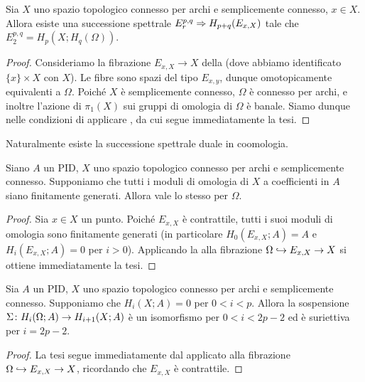 \begin{proposition}
Sia $X$ uno spazio topologico connesso per archi e semplicemente connesso, $x\in X$. Allora esiste una successione spettrale $E^{p,q}_r\Rightarrow H_{p+q}(E_{x,X})$ tale che $E^{p,q}_2=H_p(X;H_q(\Omega))$.
\end{proposition}
\begin{proof}
Consideriamo la fibrazione $E_{x,X}\to X$ della  (dove abbiamo identificato $\{x\}\times X$ con $X$). Le fibre sono spazi del tipo $E_{x,y}$, dunque omotopicamente equivalenti a $\Omega$. Poiché $X$ è semplicemente connesso, $\Omega$ è connesso per archi, e inoltre l'azione di $\pi_1(X)$ sui gruppi di omologia di $\Omega$ è banale. Siamo dunque nelle condizioni di applicare \missing{}, da cui segue immediatamente la tesi.
\end{proof}
Naturalmente esiste la successione spettrale duale in coomologia.

\begin{proposition}
Siano $A$ un PID, $X$ uno spazio topologico connesso per archi e semplicemente connesso. Supponiamo che tutti i moduli di omologia di $X$ a coefficienti in $A$ siano finitamente generati. Allora vale lo stesso per $\Omega$.
\end{proposition}
\begin{proof}
Sia $x\in X$ un punto. Poiché $E_{x,X}$ è contrattile, tutti i suoi moduli di omologia sono finitamente generati (in particolare $H_0(E_{x,X};A)=A$ e $H_i(E_{x,X};A)=0$ per $i>0$). Applicando la  alla fibrazione $\Omega\hookrightarrow E_{x,X}\to X$ si ottiene immediatamente la tesi.
\end{proof}

\begin{proposition}
Sia $A$ un PID, $X$ uno spazio topologico connesso per archi e semplicemente connesso. Supponiamo che $H_i(X;A)=0$ per $0<i<p$. Allora la sospensione $\Sigma\colon H_i(\Omega;A)\to H_{i+1}(X;A)$ è un isomorfismo per $0<i<2p-2$ ed è suriettiva per $i=2p-2$.
\end{proposition}
\begin{proof}
La tesi segue immediatamente dal  applicato alla fibrazione $\Omega\hookrightarrow E_{x,X}\to X$, ricordando che $E_{x,X}$ è contrattile.
\end{proof}